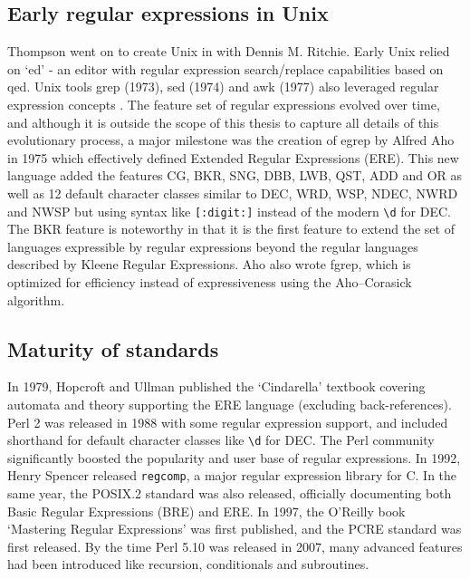 \subsection{Early regular expressions in Unix}
Thompson went on to create Unix in \citeyear{Ritchie:1974:UTS:361011.361061} with Dennis M. Ritchie.  Early Unix relied on `ed' - an editor with regular expression search/replace capabilities based on qed.  Unix tools grep (1973), sed (1974) and awk (1977) also leveraged regular expression concepts \citep{UnixReader1987}.  The feature set of regular expressions evolved over time, and although it is outside the scope of this thesis to capture all details of this evolutionary process, a major milestone was the creation of egrep by Alfred Aho in 1975 which effectively defined Extended Regular Expressions (ERE).  This new language added the features CG, BKR, SNG, DBB, LWB, QST, ADD and OR as well as 12 default character classes similar to DEC, WRD, WSP, NDEC, NWRD and NWSP but using syntax like \verb![:digit:]! instead of the modern \verb!\d! for DEC.  The BKR feature is noteworthy in that it is the first feature to extend the set of languages expressible by regular expressions beyond the regular languages described by Kleene Regular Expressions. Aho also wrote fgrep, which is optimized for efficiency instead of expressiveness using the Aho–Corasick algorithm.

\subsection{Maturity of standards}
In 1979, Hopcroft and Ullman published the `Cindarella' textbook covering automata and theory supporting the ERE language (excluding back-references).  Perl 2 was released in 1988 with some regular expression support, and included shorthand for default character classes like \verb!\d! for DEC.  The Perl community significantly boosted the popularity and user base of regular expressions.  In 1992, Henry Spencer released {\tt regcomp}, a major regular expression library for C.  In the same year, the POSIX.2 standard was also released, officially documenting both Basic Regular Expressions (BRE) and ERE.  In 1997, the O'Reilly book `Mastering Regular Expressions' was first published, and the PCRE standard was first released.  By the time Perl 5.10 was released in 2007, many advanced features had been introduced like recursion, conditionals and subroutines.
